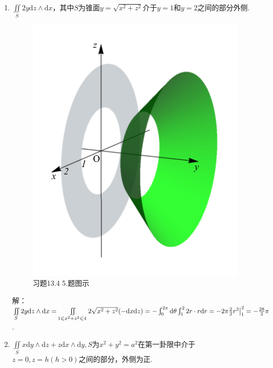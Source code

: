 \documentclass[12pt,UTF8,fleqn]{ctexart}
\newcommand{\Int}[4]{\varint\nolimits_{#1}^{#2}#3\mathrm d#4}
\newcommand{\md}[1]{\mathrm d#1}
\newcommand{\BSIInt}[2]{\iint\limits_{#1}#2}
\begin{document}
\begin{enumerate}
\item$\BSIInt S{2y\md z\wedge\md x}$，其中$S$为锥面$y=\sqrt{x^2+z^2}$介于$y=1$和$y=2$之间的部分外侧.

\begin{figure}[H]
\begin{center}
\includegraphics[height=0.5\textheight]{Figures23/Fig13-4-5.pdf}
\end{center}
\caption{习题13.4 5.题图示}
\label{13-4-5}
\end{figure}

解：$\BSIInt S{2y\md z\wedge\md x}=\BSIInt{1\leqslant x^2+z^2\leqslant4}{2\sqrt{x^2+z^2}(-\md x\md z)}=-\Int0{2\pi}{}\theta\Int12{2r\cdot r}r=-2\pi\frac23r^3\big|_1^2\\
=-\frac{28}3\pi$.

\item$\BSIInt S{x\md y\wedge\md z+z\md x\wedge\md y},S$为$x^2+y^2=a^2$在第一卦限中介于$z=0,z=h(h>0)$之间的部分，外侧为正.


\end{enumerate}
\end{document}

